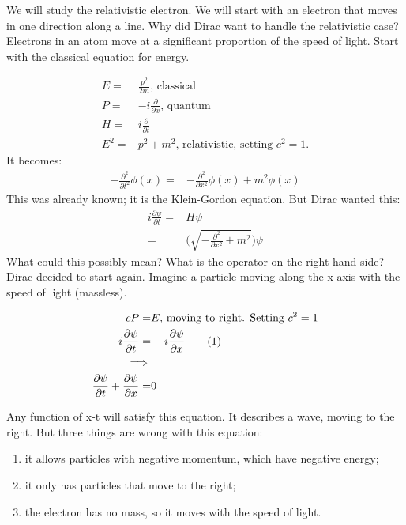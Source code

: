 \documentclass[]{article}
\newcommand\numberthis{\addtocounter{equation}{1}\tag{\theequation}}
\begin{document}
We will study the relativistic electron. We will start with an electron that moves in one direction along a line. Why did Dirac want to handle the relativistic case? Electrons in an atom move at a significant proportion of the speed of light. Start with the classical equation for energy.

\begin{align*}
	E =& \frac{p^2}{2m} \text {, classical}\\
	P =& -i \frac{\partial}{\partial x} \text{, quantum}\\
	H = & i \frac{\partial}{\partial t}\\
	E^2 =& p^2 + m^2 \text{, relativistic, setting $c^2=1$.}
\end{align*}
It becomes:
\begin{align*}
	-\frac{\partial^2}{\partial t^2} \phi(x) =& -\frac{\partial^2}{\partial x^2}\phi(x) + m^2 \phi(x) 
\end{align*}
This was already known; it is the Klein-Gordon equation. But Dirac wanted this:
\begin{align*}
	i \frac{\partial \psi}{\partial t} =& H\psi\\
	=& \big(\sqrt{- \frac{\partial^2}{\partial x^2} + m^2}\big) \psi  
\end{align*}
What could this possibly mean? What is the operator on the right hand side? Dirac decided to start again. Imagine a particle moving along the x axis with the speed of light (massless).

\begin{align*}
	c P =& E \text{, moving to right.  Setting $c^2=1$}\\
	i \frac{\partial \psi}{\partial t} =& -i \frac{\partial \psi}{\partial x} \numberthis\label{eq:dirac1:R}\\
	\implies&\\
	\frac{\partial \psi}{\partial t} + \frac{\partial \psi}{\partial x}=&0
\end{align*}

Any function of x-t will satisfy this  equation. It describes a wave, moving to the right. But three things are wrong with this equation:
\begin{enumerate}
	\item it allows particles with negative momentum, which have negative energy;\label{item:negative:energy}
	\item it only has particles that move to the right;\label{item:right:only}
	\item the electron has no mass, so it moves with the speed of light.\label{item:speed:light}
\end{enumerate}
\end{document}
